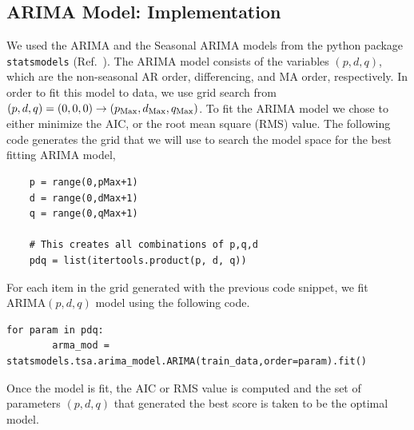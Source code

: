 \documentclass[10pt,a4paper]{article}
\begin{document}
\subsection{ARIMA Model: Implementation}\label{section: Fitting ARIMA}

We used the ARIMA and the Seasonal ARIMA models from the python package \verb|statsmodels| (Ref.~\cite{Skipper_2010}). The ARIMA model consists of the variables $(p,d,q)$, which are the non-seasonal AR order, differencing, and MA order, respectively. In order to fit this model to data, we use grid search from $(p,d,q)=(0,0,0) \rightarrow (p_{\rm Max},d_{\rm Max},q_{\rm Max}) $. To fit the ARIMA model we chose to either minimize the AIC, or the root mean square (RMS) value. The following code generates the grid that we will use to search the model space for the best fitting ARIMA model,
\begin{lstlisting}
	p = range(0,pMax+1)
	d = range(0,dMax+1)
	q = range(0,qMax+1)
	
	# This creates all combinations of p,q,d
	pdq = list(itertools.product(p, d, q))
\end{lstlisting}
For each item in the grid generated with the previous code snippet, we fit ARIMA$(p,d,q)$ model using the following code.
\begin{lstlisting}
for param in pdq:
		arma_mod = statsmodels.tsa.arima_model.ARIMA(train_data,order=param).fit()
\end{lstlisting}
Once the model is fit, the AIC or RMS value is computed and the set of parameters $(p,d,q)$ that generated the best score is taken to be the optimal model.\\
\end{document}
